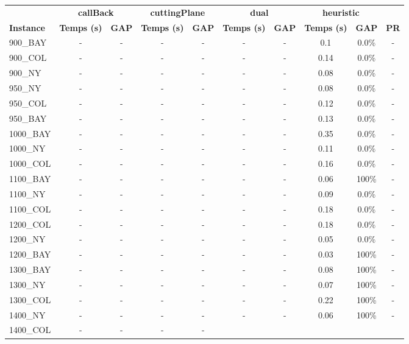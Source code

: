 \documentclass[main.tex]{subfiles}
\begin{document}
\begin{center}
\renewcommand{\arraystretch}{1.4} 
\begin{tabular}{lccccccccc}
	\hline
 & \multicolumn{2}{c}{\textbf{callBack}} & \multicolumn{2}{c}{\textbf{cuttingPlane}} & \multicolumn{2}{c}{\textbf{dual}} & \multicolumn{2}{c}{\textbf{heuristic}}\\
\textbf{Instance}  & \textbf{Temps (s)} & \textbf{GAP} & \textbf{Temps (s)} & \textbf{GAP} & \textbf{Temps (s)} & \textbf{GAP} & \textbf{Temps (s)} & \textbf{GAP} & \textbf{PR} \\\hline

900\_BAY & - & - 
 & - & - 
 & - & - 
 & 0.1 & 0.0\% & - \\
900\_COL & - & - 
 & - & - 
 & - & - 
 & 0.14 & 0.0\% & - \\
900\_NY & - & - 
 & - & - 
 & - & - 
 & 0.08 & 0.0\% & - \\
950\_NY & - & - 
 & - & - 
 & - & - 
 & 0.08 & 0.0\% & - \\
950\_COL & - & - 
 & - & - 
 & - & - 
 & 0.12 & 0.0\% & - \\
950\_BAY & - & - 
 & - & - 
 & - & - 
 & 0.13 & 0.0\% & - \\
1000\_BAY & - & - 
 & - & - 
 & - & - 
 & 0.35 & 0.0\% & - \\
1000\_NY & - & - 
 & - & - 
 & - & - 
 & 0.11 & 0.0\% & - \\
1000\_COL & - & - 
 & - & - 
 & - & - 
 & 0.16 & 0.0\% & - \\
1100\_BAY & - & - 
 & - & - 
 & - & - 
 & 0.06 &  100\%  & - \\
1100\_NY & - & - 
 & - & - 
 & - & - 
 & 0.09 & 0.0\% & - \\
1100\_COL & - & - 
 & - & - 
 & - & - 
 & 0.18 & 0.0\% & - \\
1200\_COL & - & - 
 & - & - 
 & - & - 
 & 0.18 & 0.0\% & - \\
1200\_NY & - & - 
 & - & - 
 & - & - 
 & 0.05 & 0.0\% & - \\
1200\_BAY & - & - 
 & - & - 
 & - & - 
 & 0.03 &  100\%  & - \\
1300\_BAY & - & - 
 & - & - 
 & - & - 
 & 0.08 &  100\%  & - \\
1300\_NY & - & - 
 & - & - 
 & - & - 
 & 0.07 &  100\%  & - \\
1300\_COL & - & - 
 & - & - 
 & - & - 
 & 0.22 &  100\%  & - \\
1400\_NY & - & - 
 & - & - 
 & - & - 
 & 0.06 &  100\%  & - \\
1400\_COL & - & - 
 & - & - 

\end{tabular}
\end{center}
\end{document}

